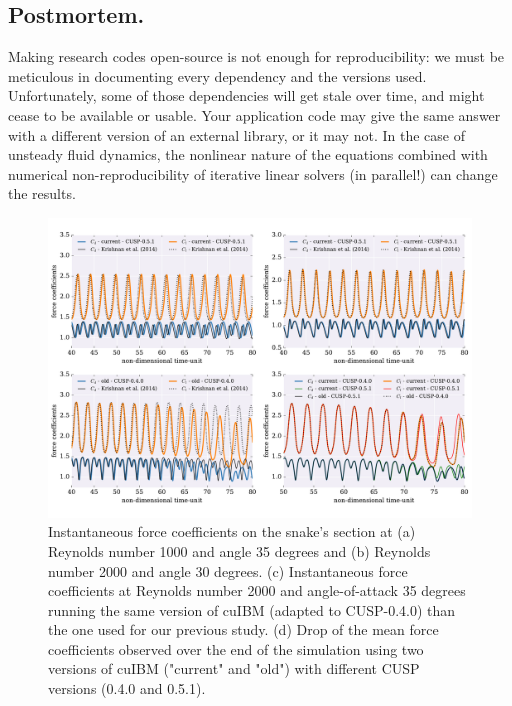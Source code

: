 \documentclass[9pt,twocolumn,twoside]{article}
\begin{document}
\subsection*{Postmortem.} 
Making research codes open-source is not enough for reproducibility: we must be meticulous in documenting every dependency and the versions used. 
Unfortunately, some of those dependencies will get stale over time, and might cease to be available or usable. 
Your application code may give the same answer with a different version of an external library, or it may not. 
In the case of unsteady fluid dynamics, the nonlinear nature of the equations combined with numerical non-reproducibility of iterative linear solvers (in parallel!) can change the results. 

\begin{figure}[t]
\centering
\includegraphics[width=1.0\textwidth]{./figures/cuibm/cuibm_forceCoefficients.pdf}
\caption{
Instantaneous force coefficients on the snake's section at (a) Reynolds number 1000 and angle 35 degrees and (b) Reynolds number 2000 and angle 30 degrees.
(c) Instantaneous force coefficients at Reynolds number 2000 and angle-of-attack 35 degrees running the same version of cuIBM (adapted to CUSP-0.4.0) than the one used for our previous study.
(d) Drop of the mean force coefficients observed over the end of the simulation using two versions of cuIBM ("current" and "old") with different CUSP versions (0.4.0 and 0.5.1).
}
\label{figure11}
\end{figure}
\end{document}
